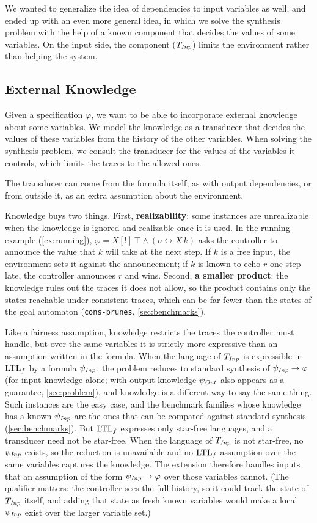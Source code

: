 We wanted to generalize the idea of dependencies to input variables as well, and ended up with an even more general idea, in which we solve the synthesis problem with the help of a known component that decides the values of some variables.
On the input side, the component ($T_{\mathit{Inp}}$) limits the environment rather than helping the system.

\subsection{External Knowledge}

Given a specification $\varphi$, we want to be able to incorporate external knowledge about some variables.
We model the knowledge as a transducer that decides the values of these variables from the history of the other variables.
When solving the synthesis problem, we consult the transducer for the values of the variables it controls, which limits the traces to the allowed ones.

The transducer can come from the formula itself, as with output dependencies, or from outside it, as an extra assumption about the environment.

Knowledge buys two things.
First, \textbf{realizability}: some instances are unrealizable when the knowledge is ignored and realizable once it is used.
In the running example (\cref{ex:running}), $\varphi = X[!]\,\top \wedge (o \leftrightarrow X\,k)$ asks the controller to announce the value that $k$ will take at the next step.
If $k$ is a free input, the environment sets it against the announcement; if $k$ is known to echo $r$ one step late, the controller announces $r$ and wins.
Second, \textbf{a smaller product}: the knowledge rules out the traces it does not allow, so the product contains only the states reachable under consistent traces, which can be far fewer than the states of the goal automaton (\texttt{cons-prunes}, \cref{sec:benchmarks}).

Like a fairness assumption, knowledge restricts the traces the controller must handle, but over the same variables it is strictly more expressive than an assumption written in the formula.
When the language of $T_{\mathit{Inp}}$ is expressible in $\text{LTL}_f$ by a formula $\psi_{\mathit{Inp}}$, the problem reduces to standard synthesis of $\psi_{\mathit{Inp}} \rightarrow \varphi$ (for input knowledge alone; with output knowledge $\psi_{\mathit{Out}}$ also appears as a guarantee, \cref{sec:problem}), and knowledge is a different way to say the same thing.
Such instances are the easy case, and the benchmark families whose knowledge has a known $\psi_{\mathit{Inp}}$ are the ones that can be compared against standard synthesis (\cref{sec:benchmarks}).
But $\text{LTL}_f$ expresses only star-free languages, and a transducer need not be star-free.
When the language of $T_{\mathit{Inp}}$ is not star-free, no $\psi_{\mathit{Inp}}$ exists, so the reduction is unavailable and no $\text{LTL}_f$ assumption over the same variables captures the knowledge.
The extension therefore handles inputs that an assumption of the form $\psi_{\mathit{Inp}} \rightarrow \varphi$ over those variables cannot.
(The qualifier matters: the controller sees the full history, so it could track the state of $T_{\mathit{Inp}}$ itself, and adding that state as fresh known variables would make a local $\psi_{\mathit{Inp}}$ exist over the larger variable set.)

